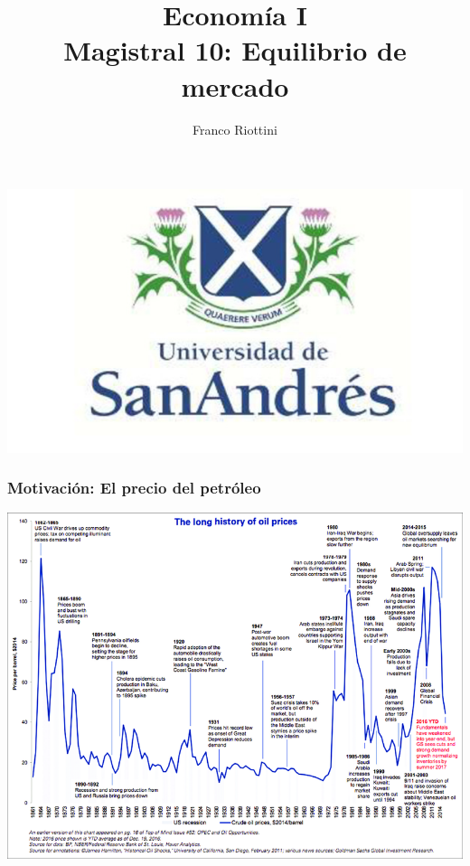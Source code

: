 \documentclass{beamer}
\title[Economía I]{Economía I \vspace{4mm}
\\ Magistral 10: Equilibrio de mercado}
\date{}
\author[Franco Riottini]{Franco Riottini}
\institute[]{Universidad de San Andrés}
\begin{document}
\begin{frame}
\titlepage
\centering
\includegraphics[scale=0.2]{../Figures/logoUDESA.jpg} 
\end{frame} 

\begin{frame}
    \frametitle{Motivación: El precio del petróleo}
    \centering
    \includegraphics[scale=1]{../Figures/M10.1.png}
\end{frame} 
\end{document}
